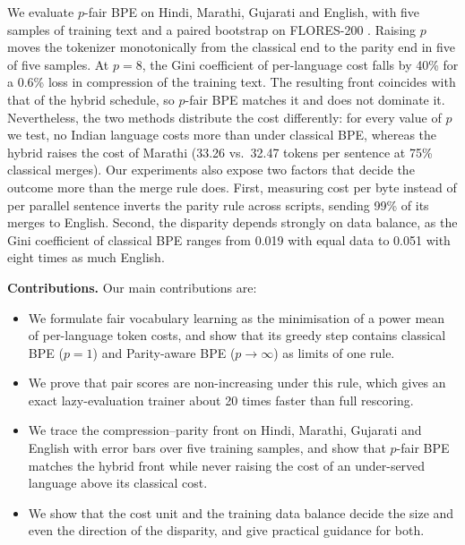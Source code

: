 We evaluate $p$-fair BPE on Hindi, Marathi, Gujarati and English, with five samples of
training text and a paired bootstrap on FLORES-200 \citep{nllb2022}. Raising $p$ moves the
tokenizer monotonically from the classical end to the parity end in five of five samples.
At $p=8$, the Gini coefficient of per-language cost falls by 40\% for a 0.6\% loss in
compression of the training text. The resulting front coincides with that of the hybrid
schedule, so $p$-fair BPE matches it and does not dominate it. Nevertheless, the two methods
distribute the cost differently: for every value of $p$ we test, no Indian language costs
more than under classical BPE, whereas the hybrid raises the cost of Marathi (33.26 vs.\
32.47 tokens per sentence at 75\% classical merges). Our experiments also expose two factors
that decide the outcome more than the merge rule does. First, measuring cost per byte
instead of per parallel sentence inverts the parity rule across scripts, sending 99\% of
its merges to English. Second, the disparity depends strongly on data balance, as the Gini
coefficient of classical BPE ranges from 0.019 with equal data to 0.051 with eight times
as much English.

\noindent\textbf{Contributions.} Our main contributions are:
\begin{itemize}
  \item We formulate fair vocabulary learning as the minimisation of a power mean of
  per-language token costs, and show that its greedy step contains classical BPE ($p=1$)
  and Parity-aware BPE ($p\to\infty$) as limits of one rule.
  \item We prove that pair scores are non-increasing under this rule, which gives an exact
  lazy-evaluation trainer about 20 times faster than full rescoring.
  \item We trace the compression--parity front on Hindi, Marathi, Gujarati and English with
  error bars over five training samples, and show that $p$-fair BPE matches the hybrid
  front while never raising the cost of an under-served language above its classical cost.
  \item We show that the cost unit and the training data balance decide the size and even
  the direction of the disparity, and give practical guidance for both.
\end{itemize}